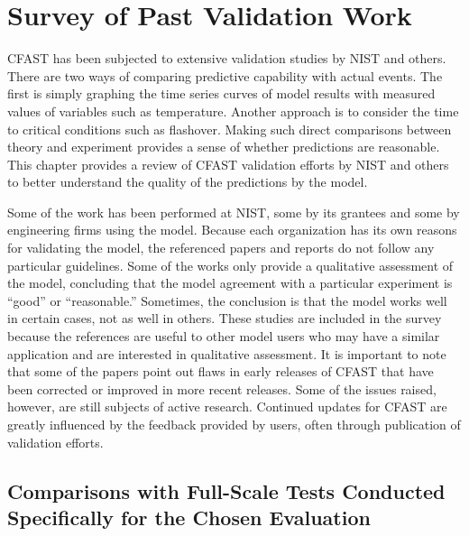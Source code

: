 \chapter{Survey of Past Validation Work}

\label{Survey_Chapter}

CFAST has been subjected to extensive validation studies by NIST and others.  There are two ways of comparing predictive capability with actual events. The first is simply graphing the time series curves of model results with measured values of variables such as temperature. Another approach is to consider the time to critical conditions such as flashover. Making such direct comparisons between theory and experiment provides a sense of whether predictions are reasonable. This chapter provides a review of CFAST validation efforts by NIST and others to better understand the quality of the predictions by the model.

Some of the work has been  performed at NIST, some by its grantees and some by engineering firms using the model.  Because each organization has its  own reasons for  validating the model, the  referenced papers and reports do not follow any particular guidelines. Some of the works only provide  a qualitative assessment  of the model,  concluding that the  model  agreement with  a  particular  experiment  is ``good''  or ``reasonable.'' Sometimes, the conclusion is that the model works well in certain cases, not as well in others. These studies are included in the survey because the references  are useful to other model users who may have a similar application  and are interested in qualitative assessment. It is important to note  that some of the papers point out flaws in early releases of CFAST that have been corrected or improved in more recent  releases. Some of  the issues raised, however,  are still subjects of  active research. Continued updates for CFAST  are greatly influenced  by   the  feedback   provided  by  users,   often  through publication of validation efforts.


\section{Comparisons with Full-Scale Tests Conducted Specifically for the Chosen Evaluation}

